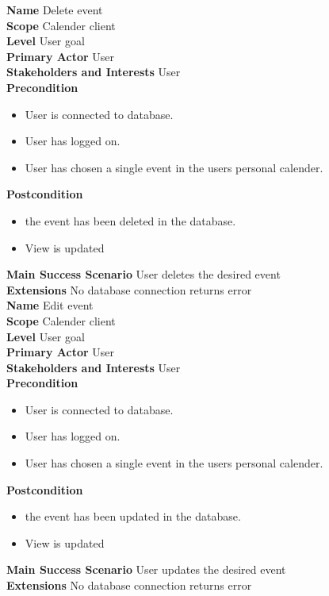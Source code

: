 \documentclass[a4paper,10pt,titlepage]{article}
\begin{document}
	\textbf{Name}
	Delete event
	\\
	\textbf{Scope}
	Calender client
	\\
	\textbf{Level}
	User goal
	\\
	\textbf{Primary Actor}
	User
	\\
	\textbf{Stakeholders and Interests}
	User
	\\
	\textbf{Precondition}
			\begin{itemize}
			\item User is connected to database.
			\item User has logged on.
			\item User has chosen a single event in the users personal calender.
			\end{itemize}
	\textbf{Postcondition}
		\begin{itemize}
				\item the event has been deleted in the database.
				\item View is updated
		\end{itemize}
	\textbf{Main Success Scenario}
	User deletes the desired event
	\\
	\textbf{Extensions}
	No database connection returns error
	\\
	
	\textbf{Name}
	Edit event
	\\
	\textbf{Scope}
	Calender client
	\\
	\textbf{Level}
	User goal
	\\
	\textbf{Primary Actor}
	User
	\\
	\textbf{Stakeholders and Interests}
	User
	\\
	\textbf{Precondition}
				\begin{itemize}
				\item User is connected to database.
				\item User has logged on.
				\item User has chosen a single event in the users personal calender.
				\end{itemize}
	\textbf{Postcondition}
		\begin{itemize}
				\item the event has been updated in the database.
				\item View is updated
		\end{itemize}
	\textbf{Main Success Scenario}
	User updates the desired event
	\\
	\textbf{Extensions}
	No database connection returns error
	\\
	
\end{document}
